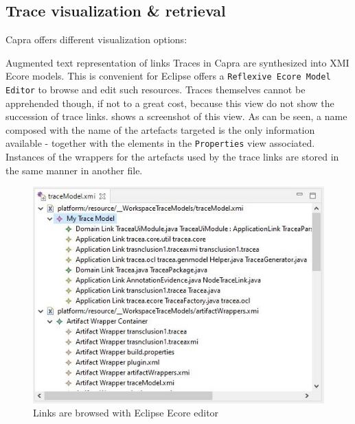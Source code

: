 \subsection{Trace visualization \& retrieval}\label{sec:visualization}
Capra offers different visualization options:
	
\begin{descriptioncompact}
    \item[Augmented text representation of links] 
Traces in Capra are synthesized into XMI Ecore models. This is convenient for Eclipse offers a \texttt{Reflexive Ecore Model Editor} to browse and edit such resources. Traces themselves cannot be apprehended though, if not to a great cost, because this view do not show the succession of trace links.  shows a screenshot of this view. As can be seen, a name composed with the name of the artefacts targeted is the only information available - together with the elements in the \texttt{Properties} view associated. 
Instances of the wrappers for the artefacts used by the trace links are stored in the same manner in another file.
\begin{figure}[h] 
	\centering
	\includegraphics[width=.65\linewidth]{images/XMIEditor.jpg}
	\caption{Links are browsed with Eclipse Ecore editor}
	\label{fig:xmieditor}
\end{figure}


\end{descriptioncompact}
